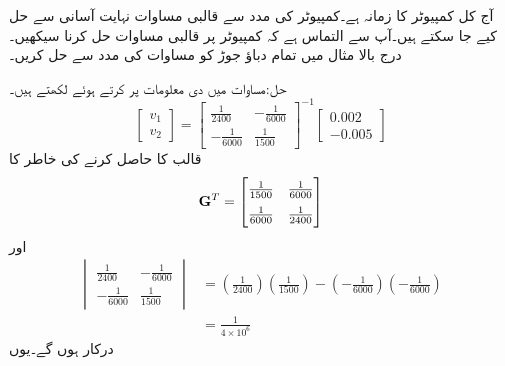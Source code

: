 آج کل کمپیوٹر کا زمانہ ہے۔کمپیوٹر کی مدد سے قالبی مساوات نہایت آسانی سے حل کیے جا سکتے ہیں۔آپ سے التماس ہے کہ کمپیوٹر پر قالبی مساوات حل کرنا سیکھیں۔
درج بالا مثال میں تمام دباؤ جوڑ کو مساوات  کی مدد سے حل کریں۔

حل:مساوات  میں دی معلومات پر کرتے ہوئے لکھتے ہیں۔
\begin{equation*}
\begin{bmatrix}
v_1\\[6pt]
v_2
\end{bmatrix}
=
\begin{bmatrix}
\frac{1}{2400} & -\frac{1}{6000}\\[6pt]
-\frac{1}{6000}& \frac{1}{1500}
\end{bmatrix}^{-1}
\begin{bmatrix}
0.002\\[6pt]
-0.005
\end{bmatrix}
\end{equation*}
قالب  کا   حاصل کرنے کی خاطر  کا   
\begin{align*}
{\bf{G}}^T=
\begin{bmatrix}   
 \frac{1}{1500}& \frac{1}{6000}\\[6pt]
\frac{1}{6000}& \frac{1}{2400}
\end{bmatrix}
\end{align*}
اور  
\begin{align*}
\begin{vmatrix}
\frac{1}{2400} & -\frac{1}{6000}\\[6pt]
-\frac{1}{6000}& \frac{1}{1500}
\end{vmatrix}
&=\left(\frac{1}{2400} \right)\left( \frac{1}{1500}\right) -\left(-\frac{1}{6000} \right) \left(- \frac{1}{6000}\right)\\
&=\frac{1}{4\times 10^{6}}
\end{align*}
درکار ہوں گے۔یوں
